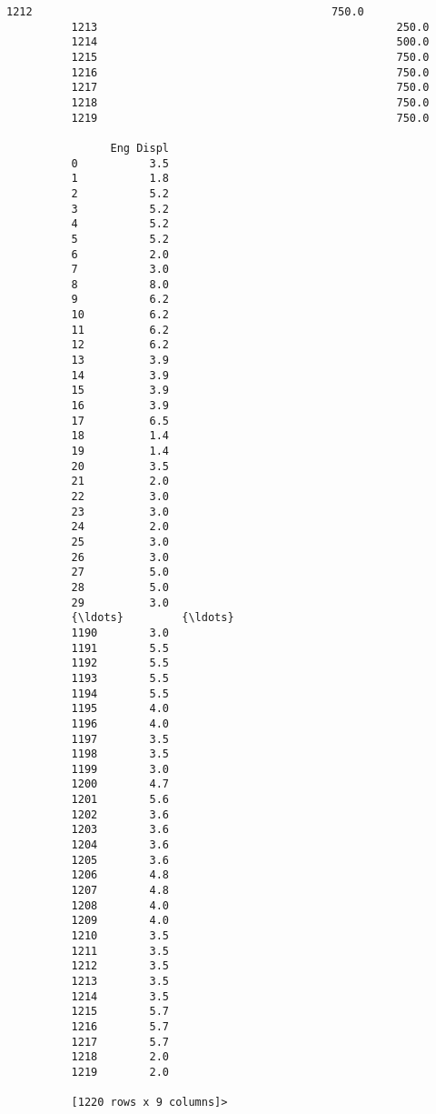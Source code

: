 \documentclass[11pt]{article}
\begin{document}
\begin{Verbatim}[commandchars=\\\{\}]
          1212                                              750.0                               
          1213                                              250.0                               
          1214                                              500.0                               
          1215                                              750.0                               
          1216                                              750.0                               
          1217                                              750.0                               
          1218                                              750.0                               
          1219                                              750.0                               
          
                Eng Displ  
          0           3.5  
          1           1.8  
          2           5.2  
          3           5.2  
          4           5.2  
          5           5.2  
          6           2.0  
          7           3.0  
          8           8.0  
          9           6.2  
          10          6.2  
          11          6.2  
          12          6.2  
          13          3.9  
          14          3.9  
          15          3.9  
          16          3.9  
          17          6.5  
          18          1.4  
          19          1.4  
          20          3.5  
          21          2.0  
          22          3.0  
          23          3.0  
          24          2.0  
          25          3.0  
          26          3.0  
          27          5.0  
          28          5.0  
          29          3.0  
          {\ldots}         {\ldots}  
          1190        3.0  
          1191        5.5  
          1192        5.5  
          1193        5.5  
          1194        5.5  
          1195        4.0  
          1196        4.0  
          1197        3.5  
          1198        3.5  
          1199        3.0  
          1200        4.7  
          1201        5.6  
          1202        3.6  
          1203        3.6  
          1204        3.6  
          1205        3.6  
          1206        4.8  
          1207        4.8  
          1208        4.0  
          1209        4.0  
          1210        3.5  
          1211        3.5  
          1212        3.5  
          1213        3.5  
          1214        3.5  
          1215        5.7  
          1216        5.7  
          1217        5.7  
          1218        2.0  
          1219        2.0  
          
          [1220 rows x 9 columns]>
\end{Verbatim}
        
\end{document}
